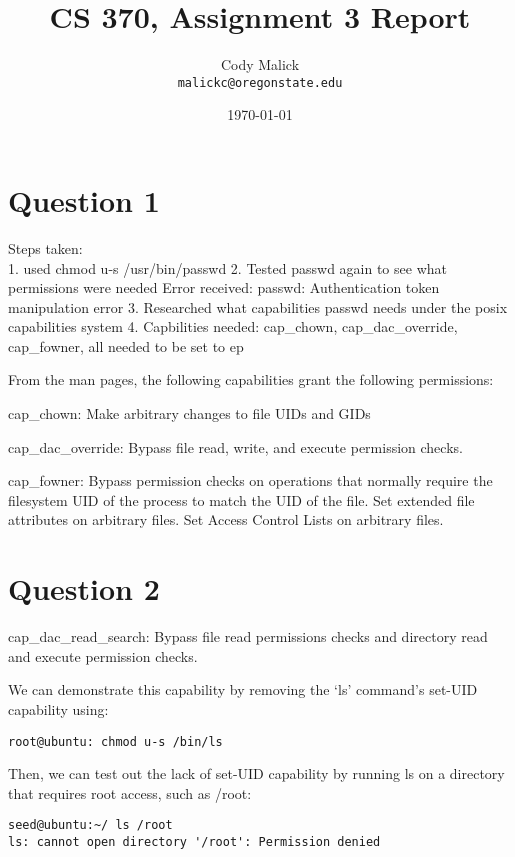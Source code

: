\documentclass[10pt,letterpaper]{article}
\begin{document}
\title{CS 370, Assignment 3 Report}
\author{Cody Malick\\
\texttt{malickc@oregonstate.edu}}
\date{\today}
\maketitle

\section*{Question 1}
Steps taken:\\
1. used chmod u-s /usr/bin/passwd
2. Tested passwd again to see what permissions were needed
Error received: passwd: Authentication token manipulation error
3. Researched what capabilities passwd needs under the posix capabilities system
4. Capbilities needed: cap\_chown, cap\_dac\_override, cap\_fowner, all needed to be
set to ep

From the man pages, the following capabilities grant the following permissions:

cap\_chown: Make arbitrary changes to file UIDs and GIDs

cap\_dac\_override: Bypass file read, write, and execute permission checks.

cap\_fowner: Bypass permission checks on operations that normally require the
filesystem UID of the process to match the UID of the file. Set
extended file attributes on arbitrary files. Set Access Control Lists
on arbitrary files.

\section*{Question 2}

cap\_dac\_read\_search: Bypass file read permissions checks and directory read and
	execute permission checks.

We can demonstrate this capability by removing the `ls' command's set-UID capability
using:
\begin{lstlisting}[caption=Removing set-UID capability on ls]
root@ubuntu: chmod u-s /bin/ls
\end{lstlisting}

Then, we can test out the lack of set-UID capability by running ls on a directory
that requires root access, such as /root:

\begin{lstlisting}
seed@ubuntu:~/ ls /root
ls: cannot open directory '/root': Permission denied
\end{lstlisting}
\end{document}
